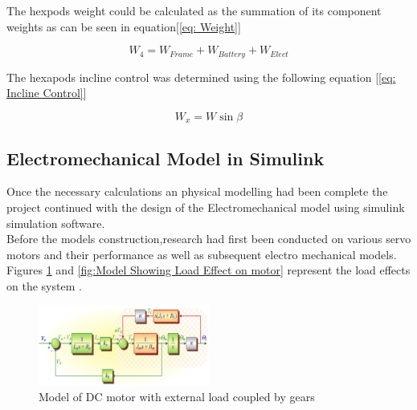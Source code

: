  

The hexpods weight could be calculated as the summation of its component weights as can be seen in equation[\ref{eq: Weight}]

\begin{equation} \label{eq: Weight}
W_4 = W_{Frame}+W_{Battery}+W_{Elect}
\end{equation}


The hexapods incline control was determined using the following equation [\ref{eq: Incline Control}]

\begin{equation} \label{eq: Incline Control}
W_x = W \sin \beta
\end{equation}




\subsection{Electromechanical Model in Simulink}
Once the necessary calculations an physical modelling had been complete the project continued with the design of the Electromechanical model using simulink simulation software.\\

Before the models construction,research had first been conducted on various servo motors and their performance as well as subsequent electro mechanical models. Figures \ref{fig:Model of DC motor with external load coupled by gears} and \ref{fig:Model Showing Load Effect on motor} represent the load effects on the system .\\

\begin{figure}[h]
 \centering
   \includegraphics[width = 0.5\textwidth]{figures/5.png}                \caption{Model of DC motor with external load coupled by gears}
   \label{fig:Model of DC motor with external load coupled by gears}
\end{figure}

